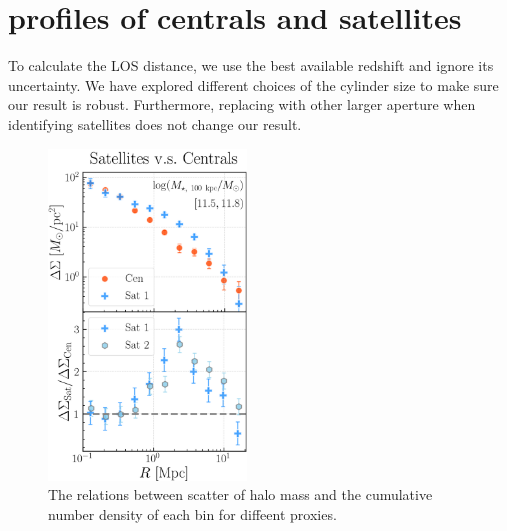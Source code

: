 \documentclass[fleqn,usenatbib,useAMS,english]{mnras}
\begin{document}
\section{\dsigma{} profiles of centrals and satellites}
	\label{app:sat_cen}

    To calculate the LOS distance, we use the best available redshift and ignore its uncertainty.
    We have explored different choices of the cylinder size to make sure our result is robust.
    Furthermore, replacing \mmax{} with other larger aperture \mstar{} when identifying
    satellites does not change our result.
    

  \begin{figure}
      \centering
      \includegraphics[width=0.47\textwidth]{figure/topn_fig_appendix_4}
      \caption{
          The relations between scatter of halo mass and the cumulative number density of each
          \topn{} bin for diffeent \mhalo{} proxies.
      }
      \label{fig:sat_cen}
  \end{figure}
\end{document}
